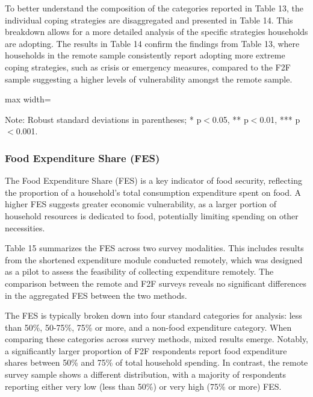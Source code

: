 \documentclass[11pt,harvard]{article}
\begin{document}
	To better understand the composition of the categories reported in Table 13, the individual coping strategies are disaggregated and presented in Table 14. This breakdown allows for a more detailed analysis of the specific strategies households are adopting. The results in Table 14 confirm the findings from Table 13, where households in the remote sample consistently report adopting more extreme coping strategies, such as crisis or emergency measures, compared to the F2F sample suggesting a higher levels of vulnerability amongst the remote sample.
	
	\begin{table}[htbp]
		\centering
		\begin{adjustbox}{max width=\textwidth}
			\begin{threeparttable}
				\caption{Distribution of Individual Coping Strategies Adopted}
				\scriptsize%
				 
				\label{tab:LCS_Ind_Modality_BF}
				\begin{tablenotes}
					\item Note: Robust standard deviations in parentheses; * p$<$0.05, ** p$<$0.01, *** p$<$0.001.
				\end{tablenotes}
			\end{threeparttable}
		\end{adjustbox}
	\end{table}
	
	
	\subsubsection{Food Expenditure Share (FES)}
	
	The Food Expenditure Share (FES) is a key indicator of food security, reflecting the proportion of a household's total consumption expenditure spent on food. A higher FES suggests greater economic vulnerability, as a larger portion of household resources is dedicated to food, potentially limiting spending on other necessities.

	Table 15 summarizes the FES across two survey modalities. This includes results from the shortened expenditure module conducted remotely, which was designed as a pilot to assess the feasibility of collecting expenditure remotely. The comparison between the remote and F2F surveys reveals no significant differences in the aggregated FES between the two methods.
	
	The FES is typically broken down into four standard categories for analysis: less than 50\%, 50-75\%, 75\% or more, and a non-food expenditure category. When comparing these categories across survey methods, mixed results emerge. Notably, a significantly larger proportion of F2F respondents report food expenditure shares between 50\% and 75\% of total household spending. In contrast, the remote survey sample shows a different distribution, with a majority of respondents reporting either very low (less than 50\%) or very high (75\% or more) FES.
	
\end{document}
